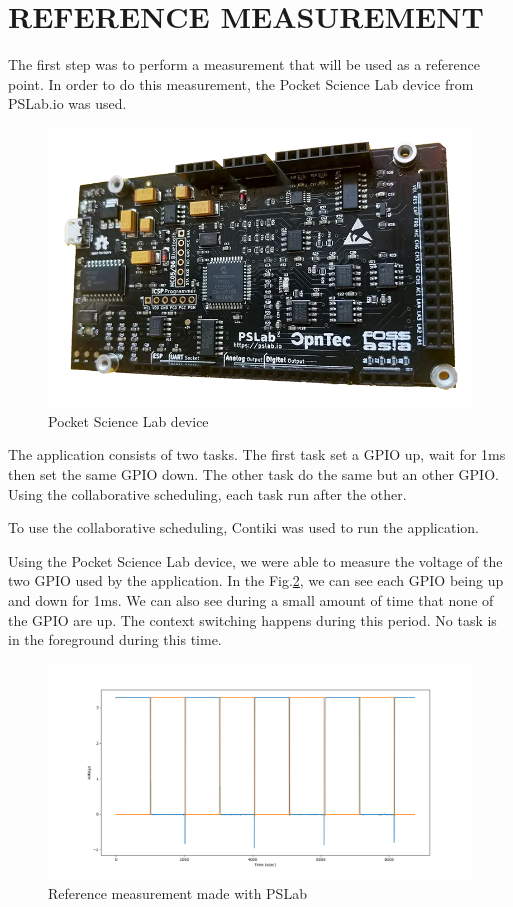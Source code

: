 \documentclass[a4paper, 10pt, conference]{ieeeconf}      %
\begin{document}
\section{\label{sec:ref}REFERENCE MEASUREMENT}
The first step was to perform a measurement that will be used as a reference point. In order to do this measurement, the Pocket Science Lab device from PSLab.io was used.

\begin{figure}[!h]
    \centering
    \includegraphics[scale=0.2]{pslab.png}
    \caption{Pocket Science Lab device}
    \label{fig:pslab}
\end{figure}

The application consists of two tasks. The first task set a GPIO up, wait for 1ms then set the same GPIO down. The other task do the same but an other GPIO. Using the collaborative scheduling, each task run after the other.

To use the collaborative scheduling, Contiki was used to run the application.

Using the Pocket Science Lab device, we were able to measure the voltage of the two GPIO used by the application. In the Fig.\ref{fig:ref}, we can see each GPIO being up and down for 1ms. We can also see during a small amount of time that none of the GPIO are up. The context switching happens during this period. No task is in the foreground during this time.


\begin{figure}[!h]
    \centering
    \includegraphics[scale=0.2]{ref.png}
    \caption{Reference measurement made with PSLab}
    \label{fig:ref}
\end{figure}
\end{document}
